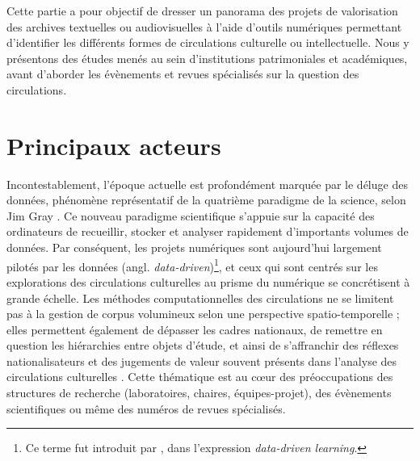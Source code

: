 \label{sect:sota_circulations}
Cette partie a pour objectif de dresser un panorama des projets de valorisation des archives textuelles ou audiovisuelles à l'aide d'outils numériques permettant d'identifier les différents formes de circulations culturelle ou intellectuelle. Nous y présentons des études menés au sein d'institutions patrimoniales et académiques, avant d'aborder les évènements et revues spécialisés sur la question des circulations.
\section{Principaux acteurs}
\label{sect:sota_acteurs} Incontestablement, l'époque actuelle est profondément marquée par le \og{}déluge des données\fg{}, phénomène représentatif de la quatrième paradigme de la science, selon Jim Gray \citep[p.~30]{hey2009jim}. Ce nouveau paradigme scientifique s'appuie sur la capacité des ordinateurs de recueillir, stocker et analyser rapidement d'importants volumes de données. Par conséquent, les projets numériques sont aujourd'hui largement \og{}pilotés par les données (angl. \textit{data-driven})\fg{}\footnote{Ce terme fut introduit par \citet{Johns1991ShouldYB}, dans l'expression \textit{data-driven learning}.}, et ceux qui sont centrés sur les explorations des circulations culturelles au prisme du numérique se concrétisent à grande échelle. Les méthodes computationnelles des circulations ne se limitent pas à la gestion de corpus volumineux selon une perspective spatio-temporelle ; elles permettent également de dépasser les cadres nationaux, de remettre en question les hiérarchies entre objets d’étude, et ainsi de s'affranchir des \og{}réflexes nationalisateurs\fg{} et des \og{}jugements de valeur\fg{} souvent présents dans l'analyse des circulations culturelles \citep[p.~12]{joyeux2022circulations}.
Cette thématique est au c\oe{}ur des préoccupations des structures de recherche (laboratoires, chaires, équipes-projet), des évènements scientifiques ou même des numéros de revues spécialisés.

